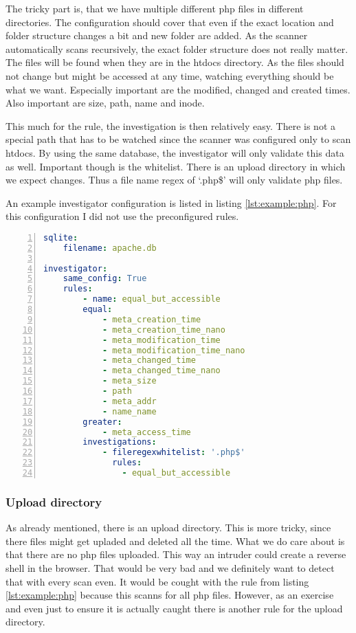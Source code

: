 The tricky part is, that we have multiple different php files in different directories. The configuration should cover that even if the exact location and folder structure changes a bit and new folder are added. As the scanner automatically scans recursively, the exact folder structure does not really matter. The files will be found when they are in the htdocs directory. As the files should not change but might be accessed at any time, watching everything should be what we want. Especially important are the modified, changed and created times. Also important are size, path, name and inode.

This much for the rule, the investigation is then relatively easy. There is not a special path that has to be watched since the scanner was configured only to scan htdocs. By using the same database, the investigator will only validate this data as well. Important though is the whitelist. There is an upload directory in which we expect changes. Thus a file name regex of `.php\$' will only validate php files.

An example investigator configuration is listed in listing \ref{lst:example:php}. For this configuration I did not use the preconfigured rules.

\begin{lstlisting}[language=yaml, numbers=left, caption=Scanner Configuration, label=lst:example:php]
sqlite:
    filename: apache.db

investigator:
    same_config: True
    rules: 
        - name: equal_but_accessible
        equal:
            - meta_creation_time
            - meta_creation_time_nano
            - meta_modification_time
            - meta_modification_time_nano
            - meta_changed_time
            - meta_changed_time_nano
            - meta_size
            - path
            - meta_addr
            - name_name
        greater:
            - meta_access_time
        investigations:
            - fileregexwhitelist: '.php$'
              rules:
                - equal_but_accessible
\end{lstlisting}

\subsubsection{Upload directory}

As already mentioned, there is an upload directory. This is more tricky, since there files might get upladed and deleted all the time. What we do care about is that there are no php files uploaded. This way an intruder could create a reverse shell in the browser. That would be very bad and we definitely want to detect that with every scan even. It would be cought with the rule from listing \ref{lst:example:php} because this scanns for all php files. However, as an exercise and even just to ensure it is actually caught there is another rule for the upload directory.

